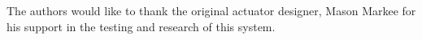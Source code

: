 The authors would like to thank the original actuator designer, Mason Markee for his support in the testing and research of this system.  